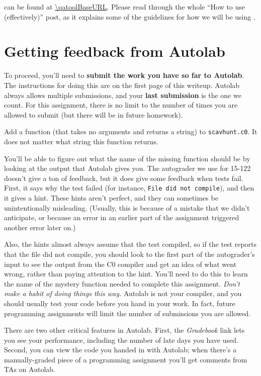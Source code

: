 \documentclass[12pt]{exam}
\begin{document}
\qatoolName{} can be found at \url{\qatoolBaseURL}. Please read
through the whole ``How to use \qatoolName{} (effectively)'' post, as
it explains some of the guidelines for how we will be using
\qatoolName.


\section{Getting feedback from Autolab}

To proceed, you'll need to \textbf{submit the work you have so far to
  Autolab}. The instructions for doing this are on the first page of
this writeup. Autolab always allows multiple submissions, and your
\textbf{last submission} is the one we count.  For this assignment,
there is no limit to the number of times you are allowed to submit (but
there will be in future homework).

\begin{task}[4]
Add a function (that takes no arguments and returns a string) to
\lstinline'scavhunt.c0'. It does not matter what string this function
returns.
\end{task}

You'll be able to figure out what the name of the missing function
should be by looking at the output that Autolab gives you.  The
autograder we use for 15-122 doesn't give a ton of feedback, but it
does give some feedback when tests fail. First, it says why the test
failed (for instance, \lstinline'File did not compile'), and then it gives
a hint. These hints aren't perfect, and they can sometimes be
unintentionally misleading. (Usually, this is because of a mistake
that we didn't anticipate, or because an error in an earlier part of
the assignment triggered another error later on.)

Also, the hints almost always assume that the test compiled, so if the
test reports that the file did not compile, you should look to the
first part of the autograder's input to see the output from the C0
compiler and get an idea of what went wrong, rather than paying
attention to the hint. You'll need to do this to learn the name of the
mystery function needed to complete this assignment. \emph{Don't make
  a habit of doing things this way.} Autolab is not your compiler, and
you should usually test your code before you hand in your work.  In
fact, future programming assignments will limit the number of
submissions you are allowed.

There are two other critical features in Autolab. First, the
\emph{Gradebook} link lets you see your performance, including the
number of late days you have used. Second, you can view the code you
handed in with Autolab; when there's a manually-graded piece of a
programming assignment you'll get comments from TAs on Autolab.
\end{document}
